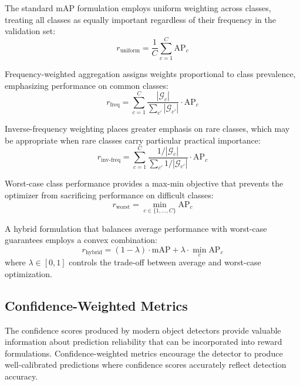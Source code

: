 The standard mAP formulation employs uniform weighting across classes, treating all classes as equally important regardless of their frequency in the validation set:
\begin{equation}
r_{\text{uniform}} = \frac{1}{C} \sum_{c=1}^{C} \text{AP}_c
\label{eq:uniform_weighting}
\end{equation}

Frequency-weighted aggregation assigns weights proportional to class prevalence, emphasizing performance on common classes:
\begin{equation}
r_{\text{freq}} = \sum_{c=1}^{C} \frac{|\mathcal{G}_c|}{\sum_{c'} |\mathcal{G}_{c'}|} \cdot \text{AP}_c
\label{eq:frequency_weighting}
\end{equation}

Inverse-frequency weighting places greater emphasis on rare classes, which may be appropriate when rare classes carry particular practical importance:
\begin{equation}
r_{\text{inv-freq}} = \sum_{c=1}^{C} \frac{1/|\mathcal{G}_c|}{\sum_{c'} 1/|\mathcal{G}_{c'}|} \cdot \text{AP}_c
\label{eq:inverse_frequency_weighting}
\end{equation}

Worst-case class performance provides a max-min objective that prevents the optimizer from sacrificing performance on difficult classes:
\begin{equation}
r_{\text{worst}} = \min_{c \in \{1, \ldots, C\}} \text{AP}_c
\label{eq:worst_case}
\end{equation}

A hybrid formulation that balances average performance with worst-case guarantees employs a convex combination:
\begin{equation}
r_{\text{hybrid}} = (1 - \lambda) \cdot \text{mAP} + \lambda \cdot \min_c \text{AP}_c
\label{eq:hybrid_aggregation}
\end{equation}
where $\lambda \in [0, 1]$ controls the trade-off between average and worst-case optimization.

\subsection{Confidence-Weighted Metrics}

The confidence scores produced by modern object detectors provide valuable information about prediction reliability that can be incorporated into reward formulations. Confidence-weighted metrics encourage the detector to produce well-calibrated predictions where confidence scores accurately reflect detection accuracy.

